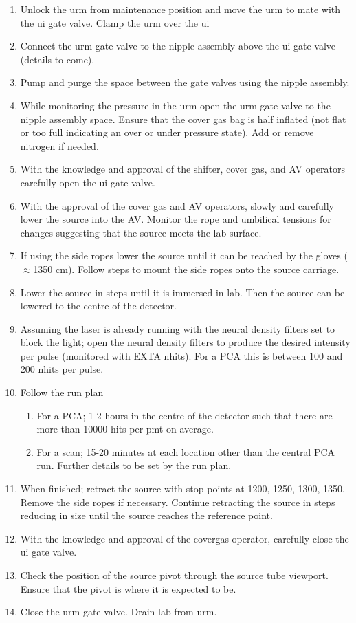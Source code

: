\begin{enumerate}
\item Unlock the urm from maintenance position and move the urm to mate with the ui gate valve. Clamp the urm over the ui 
\item Connect the urm gate valve to the nipple assembly above the ui gate valve (details to come). 
\item Pump and purge the space between the gate valves using the nipple assembly.
\item While monitoring the pressure in the urm open the urm gate valve to the nipple assembly space. Ensure that the cover gas bag is half inflated (not flat or too full indicating an over or under pressure state). Add or remove nitrogen if needed. 
\item With the knowledge and approval of the shifter, cover gas, and AV operators carefully open the ui gate valve. 
\item With the approval of the cover gas and AV operators, slowly and carefully lower the source into the AV. Monitor the rope and umbilical tensions for changes suggesting that the source meets the lab surface.
\item If using the side ropes lower the source until  it can be reached by the gloves ($\approx$1350 cm). Follow steps to mount the side ropes onto the source carriage. 
\item Lower the source in steps until it is immersed in lab. Then the source can be lowered to the centre of the detector. 
\item Assuming the laser is already running with the neural density filters set to block the light; open the neural density filters to produce the desired intensity per pulse (monitored with EXTA nhits). For a PCA this is between 100 and 200 nhits per pulse. 
\item Follow the run plan
  \begin{enumerate}
	\item For a PCA; 1-2 hours in the centre of the detector such that there are more than 10000 hits per pmt on average. 
	\item For a scan; 15-20 minutes at each location other than the central PCA run. Further details to be set by the run plan. 
  \end{enumerate}
\item When finished; retract the source  with stop points at 1200, 1250, 1300, 1350. Remove the side ropes if necessary. Continue retracting the source in steps reducing in size until the source reaches the reference point. 
\item With the knowledge and approval of the covergas operator, carefully close the ui gate valve. 
\item Check the position of the source pivot through the source tube viewport. Ensure that the pivot is where it is expected to be. 
\item Close the urm gate valve. Drain lab from urm. 
\end{enumerate}

